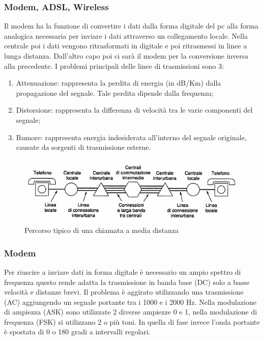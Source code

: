 \subsubsection{Modem, ADSL, Wireless}

Il modem ha la funzione di convertire i dati dalla forma digitale del pc alla forma analogica necessaria per inviare i dati attraverso un collegamento locale. Nella centrale poi i dati vengono ritrasformati in digitale e poi ritrasmessi in linee a lunga distanza. Dall'altro capo poi ci sarà il modem per la conversione inversa alla precedente. I problemi principali delle linee di trasmissioni sono 3:

\begin{enumerate}

\item{Attenuazione: rappresenta la perdita di energia (in dB/Km) dalla propagazione del segnale. Tale perdita dipende dalla frequenza};
\item{Distorsione: rappresenta la differenza di velocità tra le varie componenti del segnale};
\item{Rumore: rappresenta energia indesiderata all'interno del segnale originale, causate da sorgenti di trasmissione esterne}.

\end{enumerate}

\begin{figure}[htbp]
\centering
\includegraphics[scale=1]{images/phone.png}
\caption{Percorso tipico di una chiamata a media distanza}
\end{figure}

\subsubsection*{Modem}

Per riuscire a inviare dati in forma digitale è necessario un ampio spettro di frequenza questo rende adatta la trasmissione in banda base (DC) solo a basse velocità e distanze brevi. Il problema è aggirato utilizzando una trasmissione (AC) aggiungendo un segnale portante tra i 1000 e i 2000 Hz. Nella modulazione di ampiezza (ASK) sono utilizzate 2 diverse ampiezze 0 e 1, nella modulazione di frequenza (FSK) si utilizzano 2 o più toni. In quella di fase invece l'onda portante è spostata di 0 o 180 gradi a intervalli regolari.

